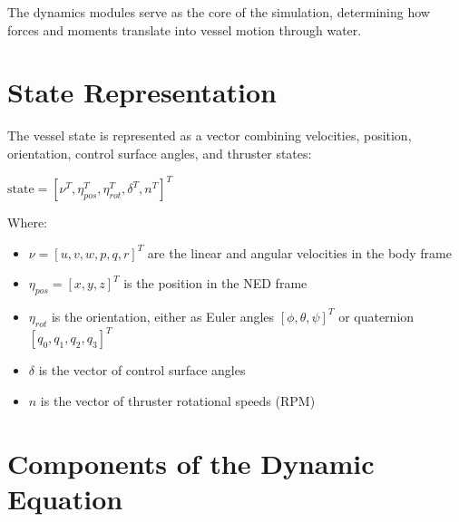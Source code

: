 \documentclass[
  letterpaper,
  DIV=11,
  numbers=noendperiod]{scrreprt}
\providecommand{\tightlist}{%
  \setlength{\itemsep}{0pt}\setlength{\parskip}{0pt}}\usepackage{longtable,booktabs,array}
\begin{document}
\begin{tcolorbox}[enhanced jigsaw, colback=white, toptitle=1mm, colframe=quarto-callout-tip-color-frame, rightrule=.15mm, breakable, title=\textcolor{quarto-callout-tip-color}{\faLightbulb}\hspace{0.5em}{Tip}, toprule=.15mm, opacitybacktitle=0.6, opacityback=0, coltitle=black, leftrule=.75mm, colbacktitle=quarto-callout-tip-color!10!white, arc=.35mm, titlerule=0mm, bottomtitle=1mm, bottomrule=.15mm, left=2mm]

The dynamics modules serve as the core of the simulation, determining
how forces and moments translate into vessel motion through water.

\end{tcolorbox}

\section*{State Representation}\label{state-representation}


The vessel state is represented as a vector combining velocities,
position, orientation, control surface angles, and thruster states:

\(\text{state} = [\nu^T, \eta_{pos}^T, \eta_{rot}^T, \delta^T, n^T]^T\)

Where:

\begin{itemize}
\tightlist
\item
  \(\nu = [u, v, w, p, q, r]^T\) are the linear and angular velocities
  in the body frame
\item
  \(\eta_{pos} = [x, y, z]^T\) is the position in the NED frame
\item
  \(\eta_{rot}\) is the orientation, either as Euler angles
  \([\phi, \theta, \psi]^T\) or quaternion \([q_0, q_1, q_2, q_3]^T\)
\item
  \(\delta\) is the vector of control surface angles
\item
  \(n\) is the vector of thruster rotational speeds (RPM)
\end{itemize}

\section*{Components of the Dynamic
Equation}\label{components-of-the-dynamic-equation}
\end{document}
